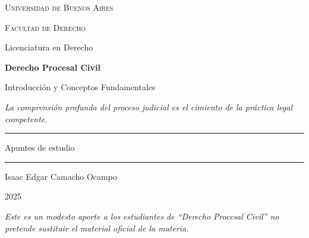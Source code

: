 \documentclass[12pt,oneside]{book}
\newcommand{\universidad}{Universidad de Buenos Aires}
\newcommand{\facultad}{Facultad de Derecho}
\newcommand{\carrera}{Licenciatura en Derecho}
\newcommand{\materia}{Derecho Procesal Civil}
\newcommand{\titulo}{Introducción y Conceptos Fundamentales}
\newcommand{\autor}{Isaac Edgar Camacho Ocampo}
\newcommand{\anio}{2025}
\begin{document}

\begin{titlepage}

\thispagestyle{empty}

\begin{center}

\vspace*{1cm}

{\large \textsc{\universidad}}

\vspace{0.2cm}

{\large \textsc{\facultad}}

\vspace{0.2cm}

{\large \carrera}

\vspace{3cm}

{\Huge \textbf{\materia}}

\vspace{1cm}

{\LARGE \titulo}

\vspace{0.8cm}

\textit{La comprensión profunda del proceso judicial es el cimiento de la práctica legal competente.}

\vspace{1.2cm}

\rule{0.70\textwidth}{0.5pt}

\vspace{0.5cm}

{\large Apuntes de estudio}

\vspace{0.5cm}

\rule{0.70\textwidth}{0.5pt}

\vfill

{\large \autor}

\vspace{0.3cm}

{\large \anio}

\end{center}

\vfill

\begin{flushleft}
\textit{Este es un modesto aporte a los estudiantes de ``Derecho Procesal Civil'' no pretende sustituir el material oficial de la materia.}
\end{flushleft}

\end{titlepage}
\end{document}
